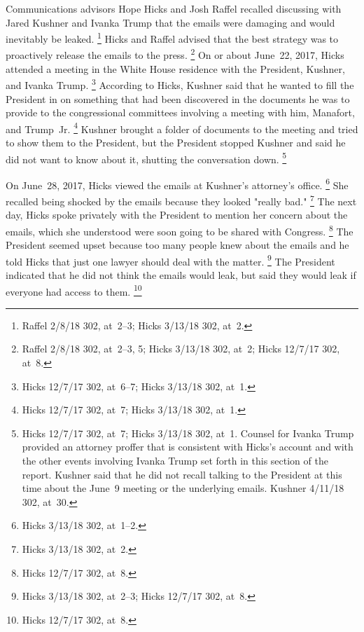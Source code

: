 Communications advisors Hope Hicks and Josh Raffel recalled discussing with Jared Kushner and Ivanka Trump that the emails were damaging and would inevitably be leaked.%
\footnote{Raffel 2/8/18 302, at~2--3;
Hicks 3/13/18 302, at~2.}
Hicks and Raffel advised that the best strategy was to proactively release the emails to the press.%
\footnote{Raffel 2/8/18 302, at~2--3, 5;
Hicks 3/13/18 302, at~2;
Hicks 12/7/17 302, at~8.}
On or about June~22, 2017, Hicks attended a meeting in the White House residence with the President, Kushner, and Ivanka Trump.%
\footnote{Hicks 12/7/17 302, at~6--7;
Hicks 3/13/18 302, at~1.}
According to Hicks, Kushner said that he wanted to fill the President in on something that had been discovered in the documents he was to provide to the congressional committees involving a meeting with him, Manafort, and Trump~Jr.%
\footnote{Hicks 12/7/17 302, at~7;
Hicks 3/13/18 302, at~1.}
Kushner brought a folder of documents to the meeting and tried to show them to the President, but the President stopped Kushner and said he did not want to know about it, shutting the conversation down.%
\footnote{Hicks 12/7/17 302, at~7;
Hicks 3/13/18 302, at~1.
Counsel for Ivanka Trump provided an attorney proffer that is consistent with Hicks's account and with the other events involving Ivanka Trump set forth in this section of the report.
Kushner said that he did not recall talking to the President at this time about the June~9 meeting or the underlying emails.
Kushner 4/11/18 302, at~30.}

On June~28, 2017, Hicks viewed the emails at Kushner's attorney's office.%
\footnote{Hicks 3/13/18 302, at~1--2.}
She recalled being shocked by the emails because they looked "really bad."%
\footnote{Hicks 3/13/18 302, at~2.}
The next day, Hicks spoke privately with the President to mention her concern about the emails, which she understood were soon going to be shared with Congress.%
\footnote{Hicks 12/7/17 302, at~8.}
The President seemed upset because too many people knew about the emails and he told Hicks that just one lawyer should deal with the matter.%
\footnote{Hicks 3/13/18 302, at~2--3;
Hicks 12/7/17 302, at~8.}
The President indicated that he did not think the emails would leak, but said they would leak if everyone had access to them.%
\footnote{Hicks 12/7/17 302, at~8.}

